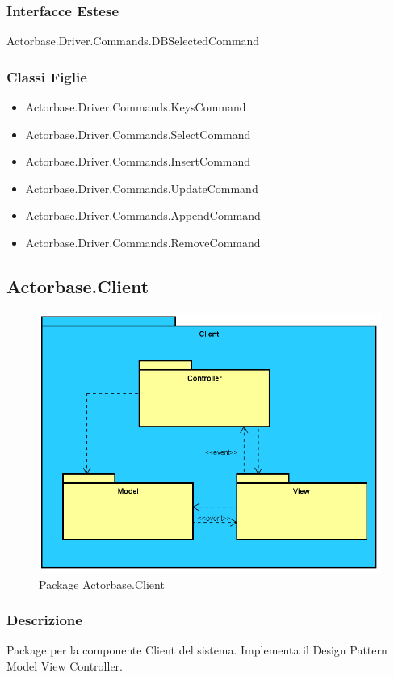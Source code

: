 \documentclass[a4paper]{article}
\begin{document}
				\subsubsection{Interfacce Estese} Actorbase.Driver.Commands.DBSelectedCommand
				\subsubsection{Classi Figlie}
					\begin{itemize}
						\item Actorbase.Driver.Commands.KeysCommand
						\item Actorbase.Driver.Commands.SelectCommand
						\item Actorbase.Driver.Commands.InsertCommand
						\item Actorbase.Driver.Commands.UpdateCommand
						\item Actorbase.Driver.Commands.AppendCommand
						\item Actorbase.Driver.Commands.RemoveCommand
					\end{itemize}

	
	\subsection{Actorbase.Client}
		\begin{figure} [H]
			\centering
			\includegraphics[scale=0.5]{ST/Client/ClientPackage.png}
        	\caption{Package Actorbase.Client}
		\end{figure}
		\subsubsection{Descrizione}
			Package per la componente Client del sistema. Implementa il Design Pattern Model View Controller.
\end{document}
